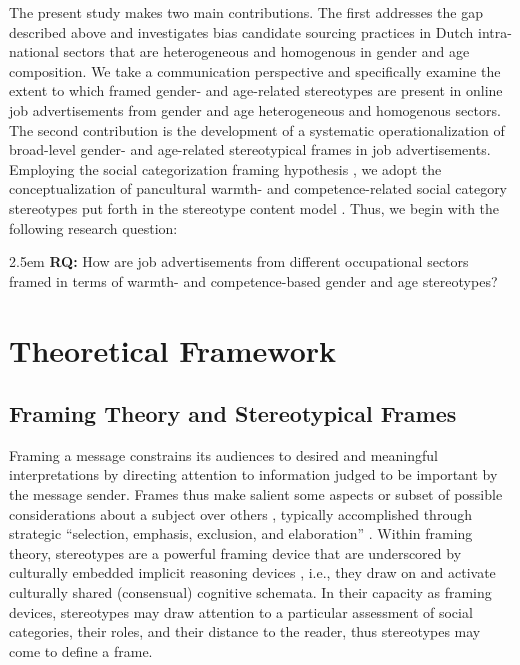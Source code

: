 \documentclass[jou]{apa7}
\begin{document}
The present study makes two main contributions. The first addresses the gap described above and investigates bias candidate sourcing practices in Dutch intra-national sectors that are heterogeneous and homogenous in gender and age composition. We take a communication perspective and specifically examine the extent to which framed gender- and age-related stereotypes are present in online job advertisements from gender and age heterogeneous and homogenous sectors. The second contribution is the development of a systematic operationalization of broad-level gender- and age-related stereotypical frames in job advertisements. Employing the social categorization framing hypothesis \parencite{Yang2015a}, we adopt the conceptualization of pancultural warmth- and competence-related social category stereotypes put forth in the stereotype content model \parencite[SCM;][]{fiskeModelOftenMixed2002}. Thus, we begin with the following research question:

\noindent \hangindent2.5em \textbf{RQ:} How are job advertisements from different occupational sectors framed in terms of warmth- and competence-based gender and age stereotypes?

\section{Theoretical Framework}
\label{theoretical_framework}
\subsection{Framing Theory and Stereotypical Frames}
\label{framing_theory_and_stereotypical_frames}
Framing a message constrains its audiences to desired and meaningful interpretations by directing attention to information judged to be important by the message sender. Frames thus make salient some aspects or subset of possible considerations about a subject over others \parencite{entmanFramingClarificationFractured1993}, typically accomplished through strategic “selection, emphasis, exclusion, and elaboration” \parencite[][p. 10]{reeseFramingPublicLife2001}. Within framing theory, stereotypes are a powerful framing device that are underscored by culturally embedded implicit reasoning devices \parencite{VanGorp2009}, i.e., they draw on and activate culturally shared (consensual) cognitive schemata. In their capacity as framing devices, stereotypes may draw attention to a particular assessment of social categories, their roles, and their distance to the reader, thus stereotypes may come to define a frame.
\end{document}
